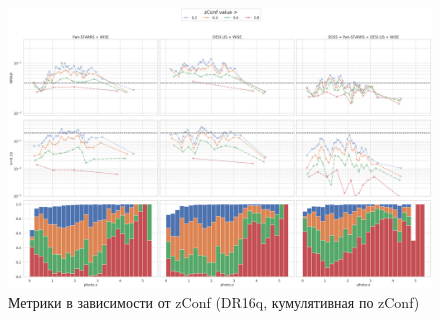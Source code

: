 \documentclass[fleqn,usenatbib]{mnras}
\begin{document}
\begin{figure}
    \centering
    \includegraphics[width=0.99\linewidth]{images/metrics-zconf-dr16q-log-cum.png}
    \caption{Метрики в зависимости от zConf (DR16q, кумулятивная по zConf)}
    \label{fig:metrics-zconf-cv2}
\end{figure}
\end{document}
